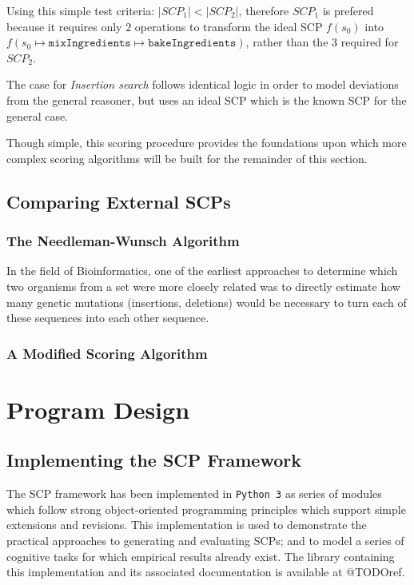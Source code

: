 \documentclass[
11pt, %
english, %
singlespacing, %
headsepline, %
]{MastersDoctoralThesis} %
\begin{document}
Using this simple test criteria: $|SCP_1| < |SCP_2|$, therefore $SCP_1$ is prefered because it requires only $2$ operations to transform the ideal SCP $f(s_0)$ into $f(s_0\longmapsto \texttt{mixIngredients} \longmapsto \texttt{bakeIngredients})$, rather than the $3$ required for $SCP_2$.

The case for \textit{Insertion search} follows identical logic in order to model deviations from the general reasoner, but uses an ideal SCP which is the known SCP for the general case.

Though simple, this scoring procedure provides the foundations upon which more complex scoring algorithms will be built for the remainder of this section.

\section{Comparing External SCPs} \label{ssec:compExt}
\subsection{The Needleman-Wunsch Algorithm} \label{ssec:nw}
In the field of Bioinformatics, one of the earliest approaches to determine which two organisms from a set were more closely related was to directly estimate how many genetic mutations (insertions, deletions) would be necessary to turn each of these sequences into each other sequence.

\subsection{A Modified Scoring Algorithm} \label{ssec:nw_mod}


\chapter{Program Design}
\section{Implementing the SCP Framework}
The SCP framework has been implemented in \texttt{Python 3} as series of modules which follow strong object-oriented programming principles which support simple extensions and revisions. This implementation is used to demonstrate the practical approaches to generating and evaluating SCPs; and to model a series of cognitive tasks for which empirical results already exist. The library containing this implementation and its associated documentation is available at @TODOref.
\end{document}
